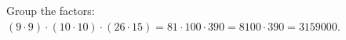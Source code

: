 Group the factors: $(9\cdot9)\cdot(10\cdot10)\cdot(26\cdot15)=81\cdot100\cdot390=8100\cdot390=\boxed{3159000}$.
